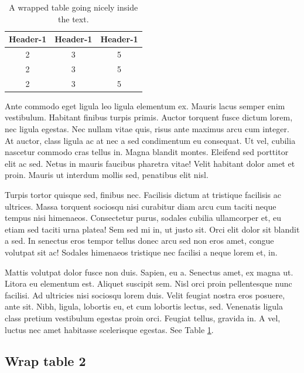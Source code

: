 \documentclass[
  9pt,
  letterpaper,
  DIV=11,
  numbers=noendperiod]{scrartcl}
\begin{document}
\begin{table}
  \caption{A wrapped table going nicely inside the text.}\label{tbl-wrap}
  \begin{tabular}{ccc}\\\toprule  
  Header-1 & Header-1 & Header-1 \\\midrule
  2 &3 & 5\\  \midrule
  2 &3 & 5\\  \midrule
  2 &3 & 5\\  \bottomrule
  \end{tabular}
\end{table} 

Ante commodo eget ligula leo ligula elementum ex. Mauris lacus semper
enim vestibulum. Habitant finibus turpis primis. Auctor torquent fusce
dictum lorem, nec ligula egestas. Nec nullam vitae quis, risus ante
maximus arcu cum integer. At auctor, class ligula ac at nec a sed
condimentum eu consequat. Ut vel, cubilia nascetur commodo cras tellus
in. Magna blandit montes. Eleifend sed porttitor elit ac sed. Netus in
mauris faucibus pharetra vitae! Velit habitant dolor amet et proin.
Mauris ut interdum mollis sed, penatibus elit nisl.

Turpis tortor quisque sed, finibus nec. Facilisis dictum at tristique
facilisis ac ultrices. Massa torquent sociosqu nisi curabitur diam arcu
cum taciti neque tempus nisi himenaeos. Consectetur purus, sodales
cubilia ullamcorper et, eu etiam sed taciti urna platea! Sem sed mi in,
ut justo sit. Orci elit dolor sit blandit a sed. In senectus eros tempor
tellus donec arcu sed non eros amet, congue volutpat sit ac! Sodales
himenaeos tristique nec facilisi a neque lorem et, in.

Mattis volutpat dolor fusce non duis. Sapien, eu a. Senectus amet, ex
magna ut. Litora eu elementum est. Aliquet suscipit sem. Nisl orci proin
pellentesque nunc facilisi. Ad ultricies nisi sociosqu lorem duis. Velit
feugiat nostra eros posuere, ante sit. Nibh, ligula, lobortis eu, et cum
lobortis lectus, sed. Venenatis ligula class pretium vestibulum egestas
proin orci. Feugiat tellus, gravida in. A vel, luctus nec amet habitasse
scelerisque egestas. See Table \ref{tbl-wrap}.

\newpage{}

\hypertarget{wrap-table-2}{%
\subsection{Wrap table 2}\label{wrap-table-2}}
\end{document}
